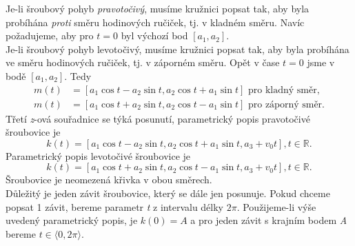 Je-li šroubový pohyb \emph{pravotočivý}, musíme kružnici popsat tak, aby byla probíhána \emph{proti} směru hodinových ručiček, tj. v kladném směru.
Navíc požadujeme, aby pro $t=0$ byl výchozí bod $[a_1, a_2]$. \\
Je-li šroubový pohyb levotočivý, musíme kružnici popsat tak, aby byla probíhána ve směru hodinových ručiček, tj. v záporném směru. Opět v čase $t=0$
jsme v bodě $[a_1, a_2]$. Tedy
\begin{align*}
	m(t) & = [a_1\cos{t}-a_2\sin{t}, a_2\cos{t}+a_1\sin{t}] \text{ pro kladný směr},   \\
	m(t) & = [a_1\cos{t}+a_2\sin{t}, a_2\cos{t}-a_1\sin{t}] \text{ pro záporný směr}. 
\end{align*}
Třetí \textit{z}-ová souřadnice se týká posunutí, parametrický popis pravotočivé šroubovice je
$$k(t) = [a_1\cos{t}-a_2\sin{t}, a_2\cos{t}+a_1\sin{t}, a_3+v_0 t], t \in \mathbb{R}.$$
Parametrický popis levotočivé šroubovice je
$$k(t) = [a_1\cos{t}+a_2\sin{t}, a_2\cos{t}-a_1\sin{t}, a_3+v_0 t], t \in \mathbb{R}.$$
Šroubovice je neomezená křivka v obou směrech. \\
Důležitý je jeden závit šroubovice, který se dále jen posunuje. Pokud chceme popsat 1 závit, bereme parametr \textit{t} z intervalu délky $2\pi$.
Použijeme-li výše uvedený parametrický popis, je $k(0)=A$ a pro jeden závit s krajním bodem \textit{A} bereme $t\in\langle0, 2\pi\rangle$.
\clearpage
